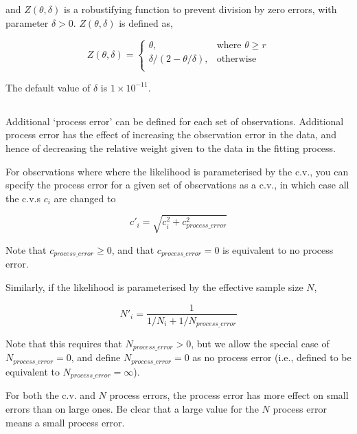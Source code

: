 and $Z \left(\theta,\delta \right)$ is a robustifying function to prevent division by zero errors, with parameter $\delta>0$. $Z \left(\theta,\delta \right)$ is defined as,

\begin{equation}
   Z \left(\theta,\delta \right) = \begin{cases}
	  \theta, & \text{where $\theta \ge r$} \\
	  \delta/\left( 2-\theta/\delta \right), & \text{otherwise} \\  
  \end{cases}
\end{equation}

The default value of $\delta$ is $1 \times 10^{-11}$.

\subsection{}

Additional `process error' can be defined for each set of observations. Additional process error has the effect of increasing the observation error in the data, and hence of decreasing the relative weight given to the data in the fitting process. 

For observations where where the likelihood is parameterised by the c.v., you can specify the process error for a given set of observations as a c.v., in which case all the c.v.s $c_i$ are changed to

\begin{equation}
  c'_i  = \sqrt {c_i^2  + c_{process\_error}^2 } 
\end{equation}

Note that $c_{process\_ error} \ge 0$, and that $c_{process\_ error} = 0$ is equivalent to no process error.

Similarly, if the likelihood is parameterised by the effective sample size $N$,

\begin{equation}
 N'_i  = \frac{1}{1 / {N_i}+ 1 / N_{process\_error}}
\end{equation}

Note that this requires that $N_{process\_ error} > 0$, but we allow the special case of $N_{process\_ error}=0$, and define $N_{process\_ error}=0$ as no process error (i.e., defined to be equivalent to $N_{process\_ error}=\infty$). 

For both the c.v. and $N$ process errors, the process error has more effect on small errors than on large ones. Be clear that a large value for the $N$ process error means a small process error.

